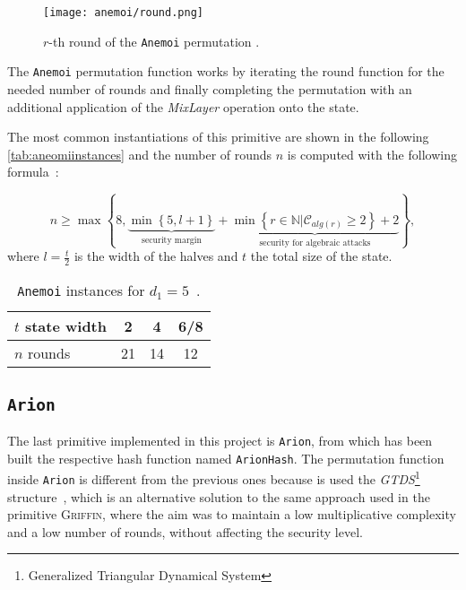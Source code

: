 \documentclass[12pt, a4paper]{report}
\begin{document}
\begin{figure}[H]
  \begin{center}
    \texttt{[image: anemoi/round.png]}
  \end{center}
  \caption{$r$-th round of the \texttt{Anemoi} permutation \cite[Fig.~6]{anemoi}.}\label{fig:anemoi}
\end{figure}

The \texttt{Anemoi} permutation function works by iterating the round function for the needed number of rounds and finally completing the permutation with an additional application of the \textit{MixLayer} operation onto the state.

The most common instantiations of this primitive are shown in the following \autoref{tab:aneomiinstances} and the number of rounds $n$ is computed with the following formula~\cite[Eq.~(2)]{anemoi}:

\begin{equation}
  n \ge \max \left\{ 8, \underbrace{\min \left\{ 5, l+1 \right\}}_{\text{security margin}} + \underbrace{\min \left\{ r \in \mathbb{N} | \mathcal{C}_{alg(r)} \ge 2 \right\} + 2}_{\text{security for algebraic attacks}} \right\} ,
  \label{eq:anemoirounds}
\end{equation}
where $l = \frac{t}{2}$ is the width of the halves and $t$ the total size of the state.

\begin{table}[H]
  \caption{\texttt{Anemoi} instances for $d_1 = 5$~\cite[Tab.~1]{anemoi}.}\label{tab:aneomiinstances}
  \begin{center}
    \begin{tabular}{|l|c|c|c|}
      \hline
      $t$ state width & 2 & 4 & 6/8 \\
      \hline
      $n$ rounds & 21 & 14 & 12 \\
      \hline
    \end{tabular}
  \end{center}
\end{table}

\subsection{\texttt{Arion}}\label{subsec:arion}

The last primitive implemented in this project is \texttt{Arion}, from which has been built the respective hash function named \texttt{ArionHash}.
The permutation function inside \texttt{Arion} is different from the previous ones because is used the \textit{GTDS}\footnote{Generalized Triangular Dynamical System} structure~\cite{gtds}, which is an alternative solution to the same approach used in the primitive \textsc{Griffin}, where the aim was to maintain a low multiplicative complexity and a low number of rounds, without affecting the security level.
\end{document}

